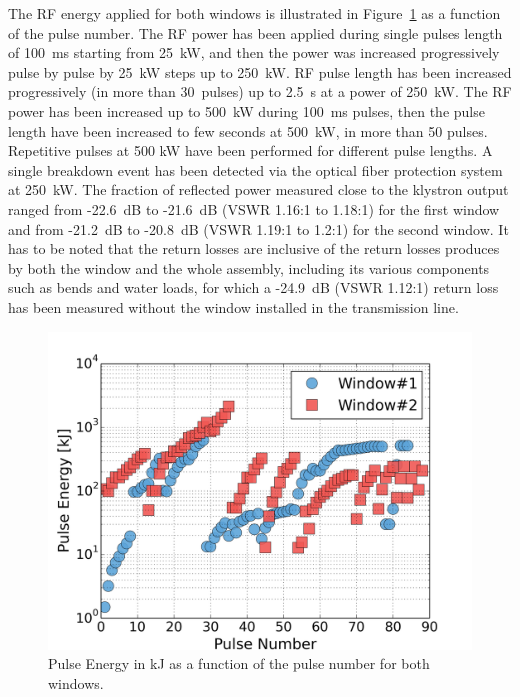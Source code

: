 The RF energy applied for both windows is illustrated in Figure~\ref{fig:iterwindowspulseenergy} as a function of the pulse number. The RF power has been applied during single pulses length of 100~ms starting from 25~kW, and then the power was increased progressively pulse by pulse by 25~kW steps up to 250~kW. RF pulse length has been increased progressively (in more than 30~pulses) up to 2.5~s at a power of 250~kW. The RF power has been increased up to 500~kW during 100~ms pulses, then the pulse length have been increased to few seconds at 500~kW, in more than 50 pulses. Repetitive pulses at 500 kW have been performed for different pulse lengths. A single breakdown event has been detected via the optical fiber protection system at 250~kW. The fraction of reflected power measured close to the klystron output ranged from -22.6~dB to -21.6~dB (VSWR 1.16:1 to 1.18:1) for the first window and from -21.2~dB to -20.8~dB (VSWR 1.19:1 to 1.2:1) for the second window. It has to be noted that the return losses are inclusive of the return losses produces by both the window and the whole assembly, including its various components such as bends and water loads, for which a -24.9~dB (VSWR 1.12:1) return loss has been measured without the window installed in the transmission line.

\begin{figure}
	\centering
	\includegraphics[width=1.0\linewidth]{figures/chap3/ITER_window/ITER_windows_pulse_energy}
	\caption{Pulse Energy in kJ as a function of the pulse number for both windows.}
	\label{fig:iterwindowspulseenergy}
\end{figure}

